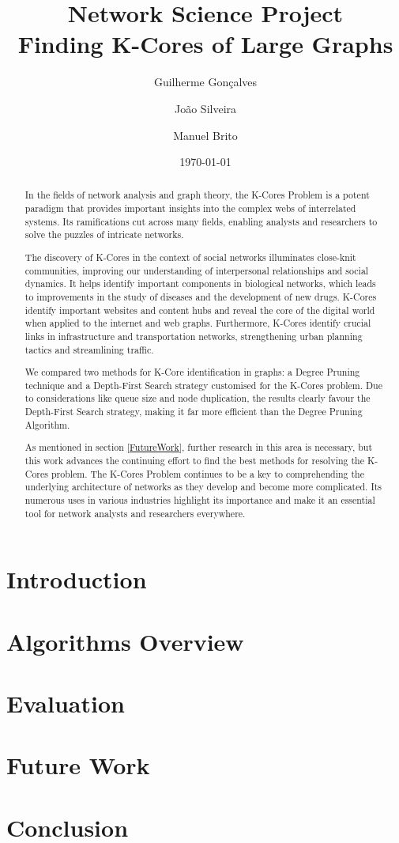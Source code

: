 \documentclass[a4paper, 11pt]{article}
\title{Network Science Project \\ \textbf{Finding K-Cores of Large Graphs}}
\author{Guilherme Gonçalves \and João Silveira \and Manuel Brito}
\date{\today}
\begin{document}
\maketitle

\begin{abstract}
    In the fields of network analysis and graph theory, the K-Cores Problem is a potent paradigm that provides important insights into the complex webs of interrelated systems. Its ramifications cut across many fields, enabling analysts and researchers to solve the puzzles of intricate networks.
    
    The discovery of K-Cores in the context of social networks illuminates close-knit communities, improving our understanding of interpersonal relationships and social dynamics. It helps identify important components in biological networks, which leads to improvements in the study of diseases and the development of new drugs. K-Cores identify important websites and content hubs and reveal the core of the digital world when applied to the internet and web graphs. Furthermore, K-Cores identify crucial links in infrastructure and transportation networks, strengthening urban planning tactics and streamlining traffic.

    We compared two methods for K-Core identification in graphs: a Degree Pruning technique and a Depth-First Search strategy customised for the K-Cores problem. Due to considerations like queue size and node duplication, the results clearly favour the Depth-First Search strategy, making it far more efficient than the Degree Pruning Algorithm.

    As mentioned in section \ref{FutureWork}, further research in this area is necessary, but this work advances the continuing effort to find the best methods for resolving the K-Cores problem. The K-Cores Problem continues to be a key to comprehending the underlying architecture of networks as they develop and become more complicated. Its numerous uses in various industries highlight its importance and make it an essential tool for network analysts and researchers everywhere.
\end{abstract}


\clearpage
\tableofcontents
\clearpage


\section{Introduction}


\section{Algorithms Overview}


\section{Evaluation}


\section{Future Work}

\label{FutureWork}

\section{Conclusion}


\clearpage


\end{document}

